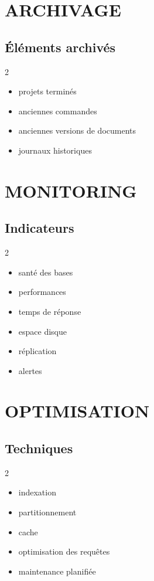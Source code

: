 \documentclass[12pt,a4paper,oneside]{book}
\begin{document}
\chapter{ARCHIVAGE}

\section{Éléments archivés}
\begin{multicols}{2}
\begin{itemize}
\item projets terminés
\item anciennes commandes
\item anciennes versions de documents
\item journaux historiques
\end{itemize}
\end{multicols}

\chapter{MONITORING}

\section{Indicateurs}
\begin{multicols}{2}
\begin{itemize}
\item santé des bases
\item performances
\item temps de réponse
\item espace disque
\item réplication
\item alertes
\end{itemize}
\end{multicols}

\chapter{OPTIMISATION}

\section{Techniques}
\begin{multicols}{2}
\begin{itemize}
\item indexation
\item partitionnement
\item cache
\item optimisation des requêtes
\item maintenance planifiée
\end{itemize}
\end{multicols}
\end{document}
